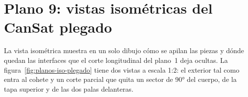 \newcommand{\plCorte}[6]{%
  \filldraw[fill=#6!25!white, draw=#6!80!black, line width=0.3pt]
    ({#2*cos(#1)},{#2*sin(#1)},{#4}) -- ({#3*cos(#1)},{#3*sin(#1)},{#4}) --
    ({#3*cos(#1)},{#3*sin(#1)},{#5}) -- ({#2*cos(#1)},{#2*sin(#1)},{#5}) -- cycle;
  \fill[pattern=north east lines, pattern color=#6!80]
    ({#2*cos(#1)},{#2*sin(#1)},{#4}) -- ({#3*cos(#1)},{#3*sin(#1)},{#4}) --
    ({#3*cos(#1)},{#3*sin(#1)},{#5}) -- ({#2*cos(#1)},{#2*sin(#1)},{#5}) -- cycle;}
\newcommand{\plG}[3]{\draw[ref] (#1) -- (#2); \node[marca] at (#2) {#3};}

\section{Plano 9: vistas isométricas del CanSat plegado}\label{sec:planos-iso}

La vista isométrica muestra en un solo dibujo cómo se apilan las piezas y dónde quedan las
interfaces que el corte longitudinal del plano~1 deja ocultas. La
figura~\ref{fig:planos-iso-plegado} tiene dos vistas a escala 1:2: el exterior tal como
entra al cohete y un corte parcial que quita un sector de \ang{90} del cuerpo, de la tapa
superior y de las dos palas delanteras.

